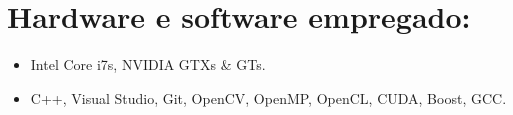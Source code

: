 %
%

\section*{Hardware e software empregado:}

\begin{itemize}
\item Intel Core i7s, NVIDIA GTXs \& GTs.
\item C++, Visual Studio, Git, OpenCV, OpenMP, OpenCL, CUDA, Boost, GCC.
\end{itemize}


